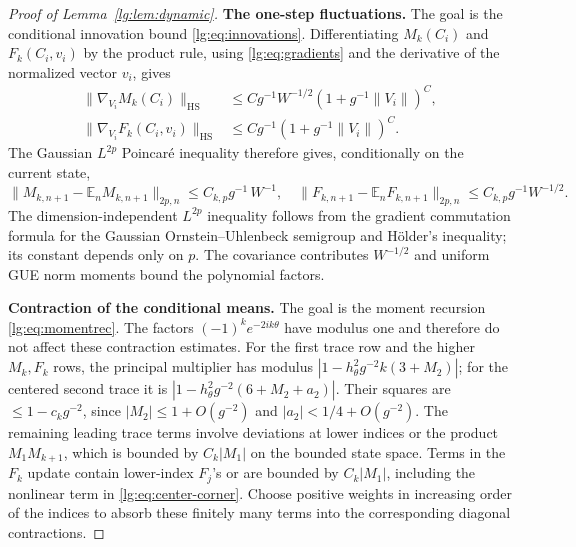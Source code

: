 \documentclass[11pt]{article}
\numberwithin{equation}{section}
\theoremstyle{remark}
\newcommand{\E}{\mathbb E}
\newcommand{\HS}{\mathrm{HS}}
\begin{document}
\begin{proof}[Proof of Lemma~\ref{lg:lem:dynamic}]
\noindent\textbf{The one-step fluctuations.}
The goal is the conditional innovation bound \eqref{lg:eq:innovations}.
Differentiating $M_k(C_i)$ and $F_k(C_i,v_i)$ by the product rule,
using \eqref{lg:eq:gradients} and the derivative of the normalized
vector $v_i$, gives
\[
 \begin{aligned}
 \|\nabla_{V_i}M_k(C_i)\|_\HS
 &\le Cg^{-1}W^{-1/2}(1+g^{-1}\|V_i\|)^C,\\
 \|\nabla_{V_i}F_k(C_i,v_i)\|_\HS
 &\le Cg^{-1}(1+g^{-1}\|V_i\|)^C.
 \end{aligned}
\]
The Gaussian $L^{2p}$ Poincar\'e inequality therefore gives,
conditionally on the current state,
\begin{equation}\label{lg:eq:innovations}
 \|M_{k,n+1}-\E_nM_{k,n+1}\|_{2p,n}\le C_{k,p}g^{-1}\,W^{-1},
 \quad
 \|F_{k,n+1}-\E_nF_{k,n+1}\|_{2p,n}\le C_{k,p}g^{-1}W^{-1/2}.
\end{equation}
The dimension-independent $L^{2p}$ inequality follows from the
gradient commutation formula for the Gaussian Ornstein--Uhlenbeck
semigroup and H\"older's inequality; its constant depends only on $p$. The covariance contributes
$W^{-1/2}$ and uniform GUE norm moments bound the polynomial factors.

\noindent\textbf{Contraction of the conditional means.}
The goal is the moment recursion \eqref{lg:eq:momentrec}.
The factors $(-1)^ke^{-2ik\theta}$ have modulus one and therefore
do not affect these contraction estimates.
For the first trace row and the higher $M_k,F_k$ rows, the principal
multiplier has modulus $|1-h_\theta^2g^{-2}k(3+M_2)|$; for the centered
second trace it is $|1-h_\theta^2g^{-2}(6+M_2+a_2)|$.
Their squares are $\le1-c_kg^{-2}$, since $|M_2|\le1+O(g^{-2})$ and
$|a_2|<1/4+O(g^{-2})$. The remaining leading trace terms involve deviations at lower
indices or the product $M_1M_{k+1}$, which is bounded by $C_k|M_1|$
on the bounded state space. Terms in the $F_k$ update contain lower-index $F_j$'s or are bounded by
$C_k|M_1|$, including the nonlinear term in \eqref{lg:eq:center-corner}.
Choose positive weights in increasing order of the indices to absorb
these finitely many terms into the corresponding diagonal contractions.


\end{proof}
\end{document}
